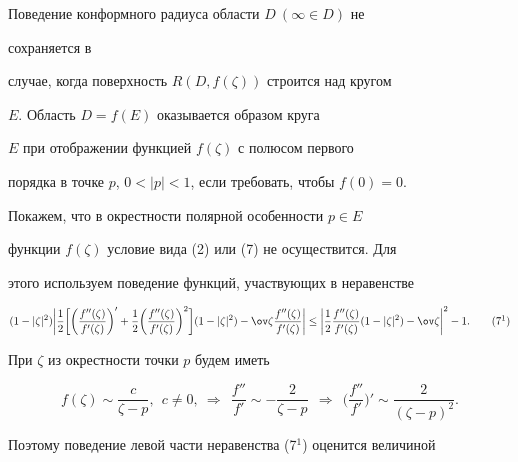  


Поведение конформного радиуса области $D\ (\infty\in D)$ не 


сохраняется в 


случае, когда поверхность $R(D,f(\zeta))$ строится над кругом 


$E$. Область $D=f(E)$ оказывается образом круга 


$E$ при отображении функцией $f(\zeta)$ с полюсом первого 


порядка в точке $p$, $0<|p|<1$, если требовать, чтобы $f(0)=0$. 


 


Покажем, что в окрестности полярной особенности $p\in E$ 


функции $f(\zeta)$ условие вида (2) или (7) не осуществится. Для 


этого используем поведение функций, участвующих в неравенстве 


\begin{equation}


(1-|\zeta|^2)\bigg|\frac{1}{2}\bigg[\bigg( 


\frac{f''(\zeta)}{f'(\zeta)}\bigg)'+\frac{1}{2} 


\bigg(\frac{f''(\zeta)}{f'(\zeta)}\bigg)^2\bigg] 


(1-|\zeta|^2)-\ov\zeta\frac{f''(\zeta)}{f'(\zeta)} 


\bigg|\le 


\bigg|\frac{1}{2}\frac{f''(\zeta)}{f'(\zeta)} 


(1-|\zeta|^2)-\ov\zeta\bigg|^2-1.\tag{$7^1$} 


\end{equation}


\setcounter{equation}{11}


 


При $\zeta$ из окрестности точки $p$ будем иметь 


\begin{equation} 


f(\zeta)\sim\frac{c}{\zeta-p},\ \ c\ne0,\ \Longrightarrow 


\ \ \frac{f''}{f'}\sim-\frac{2}{\zeta-p}\ \ \Longrightarrow 


\ \ \bigg(\frac{f''}{f'} \bigg)'\sim\frac{2}{(\zeta-p)^2}. 


\end{equation} 


Поэтому поведение левой части неравенства (7${}^1$) оценится величиной 


